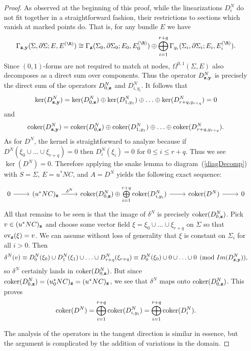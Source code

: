 \begin{proposition}
\begin{proof}
As observed at the beginning of this proof, while the linearizations $D_i^N$ do not fit together in a straightforward fashion, their restrictions to sections which vanish at marked points do. That is, for any bundle $E$ we have
\[
\Gamma_{\bf{z},\bf{y}}(\Sigma,\partial\Sigma; E,E^{(\R)}) \cong \Gamma_{\bf{z}}(\Sigma_0,\partial\Sigma_0; E_0,E_0^{(\R)}) \oplus \bigoplus\limits_{i=1}^{r+q} \Gamma_{y_i}(\Sigma_i,\partial\Sigma_i; E_i,E_i^{(\R)}).
\]
Since $(0,1)$-forms are not required to match at nodes, $\Omega^{0,1}(\Sigma,E)$ also decomposes as a direct sum over components. Thus the operator $D_{\bf{z},\bf{y}}^N$ is precisely the direct sum of the operators $D_{0,\bf{z}}^N$ and $D_{i,y_i}^N$. It follows that
\[
\ker(D_{\bf{z},\bf{y}}^N) = \ker(D_{0,\bf{z}}^N) \oplus \ker(D_{1,y_1}^N) \oplus \ldots \oplus \ker(D_{r+q,y_{r+q}}^N) = 0
\]
and
\[
\operatorname{coker}(D_{\bf{z},\bf{y}}^N) = \operatorname{coker}(D_{0,\bf{z}}^N) \oplus \operatorname{coker}(D_{1,y_1}^N) \oplus \ldots \oplus \operatorname{coker}(D_{r+q,y_{r+q}}^N).
\]
As for $D^N$, the kernel is straightforward to analyze because if $D^N(\xi_0\cup\ldots\cup\xi_{r+q})=0$ then $D_i^N(\xi_i)=0$ for $0 \leq i \leq r+q$. Thus we see $\ker(D^N)=0$. Therefore applying the snake lemma to diagram~(\ref{diagDecomp}) with $S=\Sigma$, $E=u^*NC$, and $A=D^N$ yields the following exact sequence:
\begin{equation}
\begin{tikzcd}
0 \arrow[r] & (u^*NC)_{\bf{z}} \arrow[r, "\delta^N"] & \coker(D_{0,\bf{z}}^N) \oplus \bigoplus\limits_{i=1}^{r+q} \coker(D_{i,y_i}^N) \arrow[r] & \coker(D^N) \arrow[r] & 0
\end{tikzcd}
\label{snakeN}
\end{equation}
All that remains to be seen is that the image of $\delta^N$ is precisely $\operatorname{coker}(D_{0,\bf{z}}^N)$. Pick $v \in (u^*NC)_{\bf{z}}$ and choose some vector field $\xi=\xi_0\cup\ldots\cup\xi_{r+q}$ on $\Sigma$ so that $\text{ev}_{\bf{z}}(\xi)=v$. We can assume without loss of generality that $\xi$ is constant on $\Sigma_i$ for all $i>0$. Then
\[
\delta^N(v) \equiv D_0^N(\xi_0)\cup D_1^N(\xi_1)\cup\ldots\cup D_{r+q}^N(\xi_{r+q}) \equiv D_0^N(\xi_0)\cup 0 \cup\ldots\cup 0\pmod{Im(D_{\bf{z},\bf{y}}^N)},
\]
so $\delta^N$ certainly lands in $\operatorname{coker}(D_{0,\bf{z}}^N)$. But since $\operatorname{coker}(D_{0,\bf{z}}^N)=(u_0^*NC)_{\bf{z}}=(u^*NC)_{\bf{z}}$, we see that $\delta^N$ maps onto $\operatorname{coker}(D_{0,\bf{z}}^N)$. This proves
\[
\operatorname{coker}(D^N) = \bigoplus\limits_{i=1}^{r+q} \operatorname{coker}(D_{i,y_i}^N) = \bigoplus\limits_{i=1}^{r+q} \operatorname{coker}(D_i^N).
\]

The analysis of the operators in the tangent direction is similar in essence, but the argument is complicated by the addition of variations in the domain. 


\end{proof}
\end{proposition}
